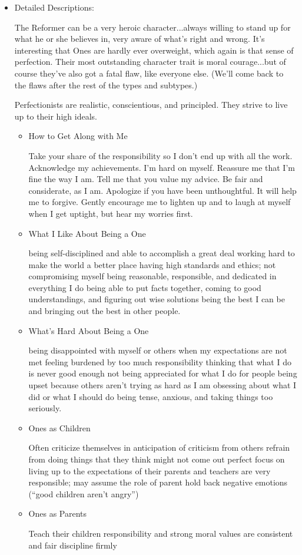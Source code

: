 \documentclass[openleft,oneside,showtrims]{memoir}
\begin{document}
\begin{itemize}
\item Detailed Descriptions:
\label{sec:orgc56b0e7}

The Reformer can be a very heroic character...always willing to stand up for what he or she believes in, very aware of what's right and wrong. It's interesting that Ones are hardly ever overweight, which again is that sense of perfection. Their most outstanding character trait is moral courage...but of course they've also got a fatal flaw, like everyone else. (We'll come back to the flaws after the rest of the types and subtypes.)

Perfectionists are realistic, conscientious, and principled. They strive to live up to their high ideals.

\begin{itemize}
\item How to Get Along with Me
\label{sec:org8e32d37}

Take your share of the responsibility so I don't end up with all the work.
Acknowledge my achievements.  I'm hard on myself. Reassure me that I'm fine the way I am. Tell me that you value my advice.  Be fair and considerate, as I am.  Apologize if you have been unthoughtful. It will help me to forgive. Gently encourage me to lighten up and to laugh at myself when I get uptight, but hear my worries first.

\item What I Like About Being a One
\label{sec:orge8895bc}

being self-disciplined and able to accomplish a great deal working hard to make the world a better place having high standards and ethics; not compromising myself being reasonable, responsible, and dedicated in everything I do being able to put facts together, coming to good understandings, and figuring out wise solutions being the best I can be and bringing out the best in other people.

\item What's Hard About Being a One
\label{sec:org6e62eb9}

being disappointed with myself or others when my expectations are not met feeling burdened by too much responsibility thinking that what I do is never good enough not being appreciated for what I do for people being upset because others aren't trying as hard as I am obsessing about what I did or what I should do being tense, anxious, and taking things too seriously.

\item Ones as Children
\label{sec:org18e1db3}

Often criticize themselves in anticipation of criticism from others refrain from doing things that they think might not come out perfect focus on living up to the expectations of their parents and teachers are very responsible; may assume the role of parent hold back negative emotions (``good children aren't angry'')

\item Ones as Parents
\label{sec:orgdd19d18}

Teach their children responsibility and strong moral values are consistent and fair discipline firmly
\end{itemize}
\end{itemize}
\end{document}
